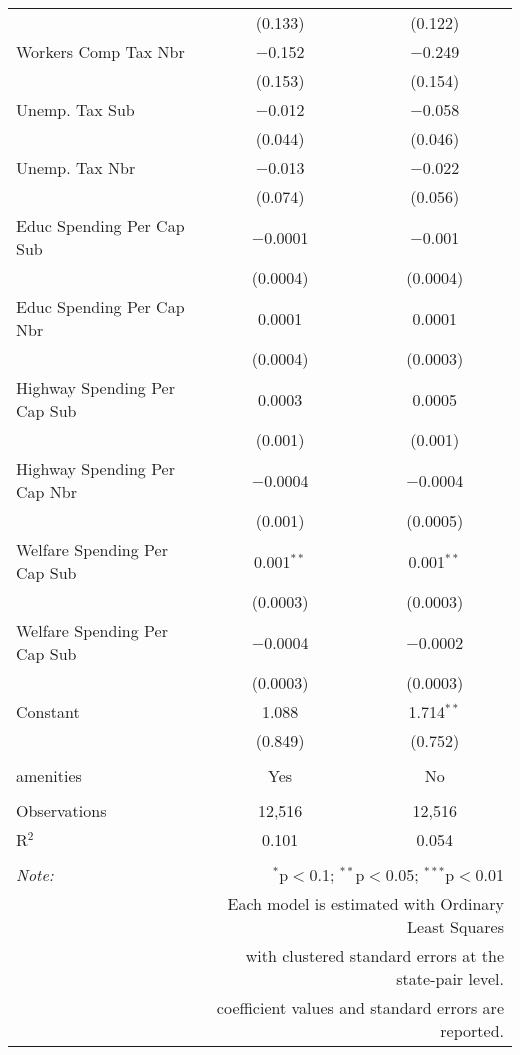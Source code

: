 \begin{table}[!htbp]
\begin{tabular}{@{\extracolsep{5pt}}lcc}
  & (0.133) & (0.122) \\ 
  Workers Comp Tax Nbr & $-$0.152 & $-$0.249 \\ 
  & (0.153) & (0.154) \\ 
  Unemp. Tax Sub & $-$0.012 & $-$0.058 \\ 
  & (0.044) & (0.046) \\ 
  Unemp. Tax Nbr & $-$0.013 & $-$0.022 \\ 
  & (0.074) & (0.056) \\ 
  Educ Spending Per Cap Sub & $-$0.0001 & $-$0.001 \\ 
  & (0.0004) & (0.0004) \\ 
  Educ Spending Per Cap Nbr & 0.0001 & 0.0001 \\ 
  & (0.0004) & (0.0003) \\ 
  Highway Spending Per Cap Sub & 0.0003 & 0.0005 \\ 
  & (0.001) & (0.001) \\ 
  Highway Spending Per Cap Nbr & $-$0.0004 & $-$0.0004 \\ 
  & (0.001) & (0.0005) \\ 
  Welfare Spending Per Cap Sub & 0.001$^{**}$ & 0.001$^{**}$ \\ 
  & (0.0003) & (0.0003) \\ 
  Welfare Spending Per Cap Sub & $-$0.0004 & $-$0.0002 \\ 
  & (0.0003) & (0.0003) \\ 
  Constant & 1.088 & 1.714$^{**}$ \\ 
  & (0.849) & (0.752) \\ 
 \hline \\[-1.8ex] 
amenities & Yes & No \\ 
\hline \\[-1.8ex] 
Observations & 12,516 & 12,516 \\ 
R$^{2}$ & 0.101 & 0.054 \\ 
\hline 
\hline \\[-1.8ex] 
\textit{Note:}  & \multicolumn{2}{r}{$^{*}$p$<$0.1; $^{**}$p$<$0.05; $^{***}$p$<$0.01} \\ 
 & \multicolumn{2}{r}{Each model is estimated with Ordinary Least Squares} \\ 
 & \multicolumn{2}{r}{with clustered standard errors at the state-pair level.} \\ 
 & \multicolumn{2}{r}{coefficient values and standard errors are reported.} \\ 
\end{tabular} 
\end{table} 
